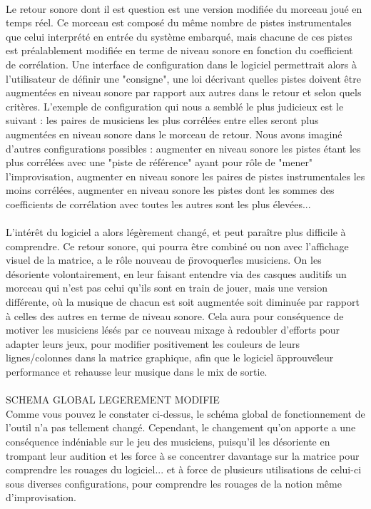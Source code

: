\paragraph{}
Le retour sonore dont il est question est une version modifiée du
morceau joué en temps réel. Ce morceau est composé du même nombre de
pistes instrumentales que celui interprété en entrée du système
embarqué, mais chacune de ces pistes est préalablement modifiée en
terme de niveau sonore en fonction du coefficient de corrélation. Une
interface de configuration dans le logiciel permettrait alors à
l'utilisateur de définir une "consigne", une loi décrivant quelles
pistes doivent être augmentées en niveau sonore par rapport aux autres
dans le retour et selon quels critères. L'exemple de configuration qui
nous a semblé le plus judicieux est le suivant : les paires de
musiciens les plus corrélées entre elles seront plus augmentées en
niveau sonore dans le morceau de retour. Nous avons imaginé d'autres
configurations possibles : augmenter en niveau sonore les pistes étant
les plus corrélées avec une "piste de référence" ayant pour rôle de
"mener" l'improvisation, augmenter en niveau sonore les paires de
pistes instrumentales les moins corrélées, augmenter en niveau sonore
les pistes dont les sommes des coefficients de corrélation avec toutes
les autres sont les plus élevées...
\paragraph{}
L'intérêt du logiciel a alors légèrement changé, et peut paraître plus
difficile à comprendre. Ce retour sonore, qui pourra être combiné ou
non avec l'affichage visuel de la matrice, a le rôle nouveau de
\"provoquer\" les musiciens. On les désoriente volontairement, en leur
faisant entendre via des casques auditifs un morceau qui n'est pas
celui qu'ils sont en train de jouer, mais une version différente, où
la musique de chacun est soit augmentée soit diminuée par rapport à
celles des autres en terme de niveau sonore. Cela aura pour
conséquence de motiver les musiciens lésés par ce nouveau mixage à
redoubler d'efforts pour adapter leurs jeux, pour modifier
positivement les couleurs de leurs lignes/colonnes dans la matrice
graphique, afin que le logiciel \"approuve\" leur performance et
rehausse leur musique dans le mix de sortie. \\
\\
SCHEMA GLOBAL LEGEREMENT MODIFIE
\\
Comme vous pouvez le constater ci-dessus, le schéma global de
fonctionnement de l'outil n'a pas tellement changé. Cependant, le
changement qu'on apporte a une conséquence indéniable sur le jeu des
musiciens, puisqu'il les désoriente en trompant leur audition et les
force à se concentrer davantage sur la matrice pour comprendre les
rouages du logiciel... et à force de plusieurs utilisations de
celui-ci sous diverses configurations, pour comprendre les rouages de
la notion même d'improvisation.

